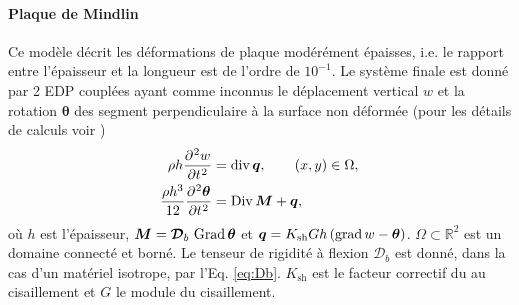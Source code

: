 \paragraph{Plaque de Mindlin}
Ce modèle décrit les déformations de plaque modérément épaisses, i.e. le rapport entre l'épaisseur et la longueur est de l'ordre de $10^{-1}$. Le système finale est donné par 2 EDP couplées ayant comme inconnus le déplacement vertical $w$ et la rotation $\bm{\theta}$ des segment perpendiculaire à la surface non déformée (pour les détails de calculs voir \cite[Chapter 10]{reddy2006theory})
\begin{equation}
\begin{aligned}
\rho h \diffp[2]{w}{t} &= \div \bm{q}, \qquad (x,y) \in \Omega, \\
\frac{\rho h^3}{12} \diffp[2]{\bm{\theta}}{t} &=\Div \bm{M} + \bm{q},
\end{aligned}
\end{equation}
où $h$ est l'épaisseur, $\bm{M}= \bm{\mathcal{D}}_b\,\operatorname*{Grad}{\bm{\theta}}$ et $\bm{q}= K_{\text{sh}} Gh\,(\operatorname*{grad} w - \bm{\theta})$. $\Omega \subset \mathbb{R}^2$ est un domaine connecté et borné. Le tenseur de rigidité à flexion $\bm{\mathcal{D}}_b$ est donné, dans la cas d'un matériel isotrope, par l'Eq. \eqref{eq:Db}. $K_{\text{sh}}$ est le facteur correctif du au cisaillement et $G$ le module du cisaillement.

